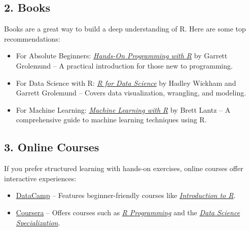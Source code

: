 \documentclass[
]{book}
\providecommand{\tightlist}{%
  \setlength{\itemsep}{0pt}\setlength{\parskip}{0pt}}
\theoremstyle{definition}
\theoremstyle{definition}
\theoremstyle{definition}
\theoremstyle{definition}
\theoremstyle{remark}
\begin{document}
\subsection*{2. Books}\label{books}

Books are a great way to build a deep understanding of R. Here are some top recommendations:

\begin{itemize}
\tightlist
\item
  For Absolute Beginners: \href{https://rstudio-education.github.io/hopr/}{\emph{Hands-On Programming with R}} by Garrett Grolemund\citep{grolemund2014hands} -- A practical introduction for those new to programming.\\
\item
  For Data Science with R: \href{https://r4ds.had.co.nz}{\emph{R for Data Science}} by Hadley Wickham and Garrett Grolemund \citep{wickham2017r} -- Covers data visualization, wrangling, and modeling.\\
\item
  For Machine Learning: \href{https://www.packtpub.com/product/machine-learning-with-r/9781782162148}{\emph{Machine Learning with R}} by Brett Lantz\citep{lantz2013machine} -- A comprehensive guide to machine learning techniques using R.
\end{itemize}

\subsection*{3. Online Courses}\label{online-courses}

If you prefer structured learning with hands-on exercises, online courses offer interactive experiences:

\begin{itemize}
\tightlist
\item
  \href{https://www.datacamp.com}{DataCamp} -- Features beginner-friendly courses like \href{https://learn.datacamp.com/courses/free-introduction-to-r}{\emph{Introduction to R}}.\\
\item
  \href{https://www.coursera.org}{Coursera} -- Offers courses such as \href{https://www.coursera.org/learn/r-programming}{\emph{R Programming}} and the \href{https://www.coursera.org/specializations/jhu-data-science}{\emph{Data Science Specialization}}.
\end{itemize}
\end{document}

